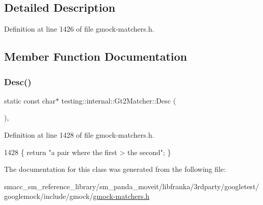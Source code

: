 \subsection{Detailed Description}


Definition at line 1426 of file gmock-\/matchers.\+h.



\subsection{Member Function Documentation}
\mbox{\label{classtesting_1_1internal_1_1Gt2Matcher_a195be80a6c19ff32fc7b6c1e26aa60da}} 
\subsubsection{\texorpdfstring{Desc()}{Desc()}}
{\footnotesize\ttfamily static const char$\ast$ testing\+::internal\+::\+Gt2\+Matcher\+::\+Desc (\begin{DoxyParamCaption}{ }\end{DoxyParamCaption})\hspace{0.3cm}{\ttfamily [inline]}, {\ttfamily [static]}}



Definition at line 1428 of file gmock-\/matchers.\+h.


\begin{DoxyCode}
1428 \{ \textcolor{keywordflow}{return} \textcolor{stringliteral}{"a pair where the first > the second"}; \}
\end{DoxyCode}


The documentation for this class was generated from the following file\+:\begin{DoxyCompactItemize}
\item 
smacc\+\_\+sm\+\_\+reference\+\_\+library/sm\+\_\+panda\+\_\+moveit/libfranka/3rdparty/googletest/googlemock/include/gmock/\hyperlink{gmock-matchers_8h}{gmock-\/matchers.\+h}\end{DoxyCompactItemize}
